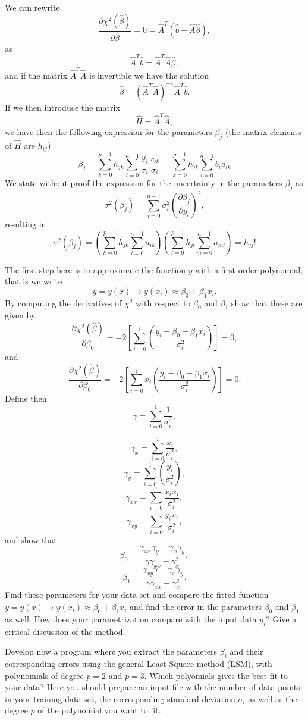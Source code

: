 \documentclass[%
oneside,                 %
final,                   %
10pt]{article}
\begin{document}
We can rewrite
\[
\frac{\partial \chi^2(\hat{\beta})}{\partial \hat{\beta}} = 0 = \hat{A}^T\left( \hat{b}-\hat{A}\hat{\beta}\right),  
\]
as
\[
\hat{A}^T\hat{b} = \hat{A}^T\hat{A}\hat{\beta},  
\]
and if the matrix $\hat{A}^T\hat{A}$ is invertible we have the solution
\[
\hat{\beta} =\left(\hat{A}^T\hat{A}\right)^{-1}\hat{A}^T\hat{b}.
\]
If we then introduce the matrix
\[
\hat{H} =  \hat{A}^T\hat{A},
\]
we have then the following expression for the parameters $\beta_j$ (the matrix elements of $\hat{H}$ are $h_{ij}$)
\[
\beta_j = \sum_{k=0}^{p-1}h_{jk}\sum_{i=0}^{n-1}\frac{y_i}{\sigma_i}\frac{x_{ik}}{\sigma_i} = \sum_{k=0}^{p-1}h_{jk}\sum_{i=0}^{n-1}b_ia_{ik}
\]
We state without proof the expression for the uncertainty  in the parameters $\beta_j$ as
\[
\sigma^2(\beta_j) = \sum_{i=0}^{n-1}\sigma_i^2\left( \frac{\partial \beta_j}{\partial y_i}\right)^2, 
\]
resulting in 
\[
\sigma^2(\beta_j) = \left(\sum_{k=0}^{p-1}h_{jk}\sum_{i=0}^{n-1}a_{ik}\right)\left(\sum_{l=0}^{p-1}h_{jl}\sum_{m=0}^{n-1}a_{ml}\right) = h_{jj}!
\]


The first step here is to approximate the function $y$ with a first-order polynomial, that is we write
\[
y=y(x) \rightarrow y(x_i) \approx \beta_0+\beta_1 x_i.
\]
By computing the derivatives of $\chi^2$ with respect to $\beta_0$ and $\beta_1$ show that these are given by
\[
\frac{\partial \chi^2(\hat{\beta})}{\partial \beta_0} = -2\left[ \sum_{i=0}^{1}\left(\frac{y_i-\beta_0-\beta_1x_{i}}{\sigma_i^2}\right)\right]=0,
\]
and
\[
\frac{\partial \chi^2(\hat{\beta})}{\partial \beta_0} = -2\left[ \sum_{i=0}^{1}x_i\left(\frac{y_i-\beta_0-\beta_1x_{i}}{\sigma_i^2}\right)\right]=0.
\]
Define then
\[
\gamma =  \sum_{i=0}^{1}\frac{1}{\sigma_i^2},
\]

\[
\gamma_x =  \sum_{i=0}^{1}\frac{x_{i}}{\sigma_i^2},
\]
\[
\gamma_y = \sum_{i=0}^{1}\left(\frac{y_i}{\sigma_i^2}\right),
\]
\[
\gamma_{xx} =  \sum_{i=0}^{1}\frac{x_ix_{i}}{\sigma_i^2},
\]
\[
\gamma_{xy} = \sum_{i=0}^{1}\frac{y_ix_{i}}{\sigma_i^2},
\]
and show that
\[
\beta_0 = \frac{\gamma_{xx}\gamma_y-\gamma_x\gamma_y}{\gamma\gamma_{xx}-\gamma_x^2},
\]
\[
\beta_1 = \frac{\gamma_{xy}\gamma-\gamma_x\gamma_y}{\gamma\gamma_{xx}-\gamma_x^2}.
\]
Find these parameters for your data set and compare the fitted function $y=y(x) \rightarrow y(x_i) \approx \beta_0+\beta_1 x_i$ and find the error in the parameters $\beta_0$ and $\beta_1$ as well.
How does your parametrization compare with the input data $y_i$? Give a critical discussion of the method.

Develop now a program where you extract the parameters $\beta_i$ and their corresponding errors using the general Least Square method (LSM), with polynomials of degree $p=2$ and $p=3$. Which polyomials gives the best fit to your data?  Here you should prepare an input file with the number of data points in your training data set, the corresponding standard deviation $\sigma_i$ as well as the degree $p$ of the polynomial you want to fit.
\end{document}
